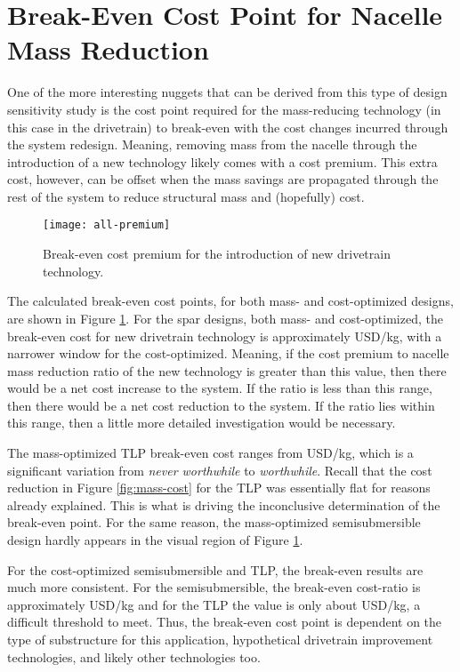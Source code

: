 \section{Break-Even Cost Point for Nacelle Mass Reduction}
One of the more interesting nuggets that can be derived from this type
of design sensitivity study is the cost point required for the
mass-reducing technology (in this case in the drivetrain) to break-even
with the cost changes incurred through the system redesign.  Meaning,
removing mass from the nacelle through the introduction of a new
technology likely comes with a cost premium.  This extra cost, however,
can be offset when the mass savings are propagated through the rest of
the system to reduce structural mass and (hopefully) cost.

\begin{figure}[htbp]
  \begin{center}
    \texttt{[image: all-premium]}
    \caption{Break-even cost premium for the introduction of new drivetrain
      technology.}
    \label{fig:premium}
  \end{center}
\end{figure}

The calculated break-even cost points, for both mass- and cost-optimized
designs, are shown in Figure \ref{fig:premium}.  For the spar designs,
both mass- and cost-optimized, the break-even cost for new drivetrain
technology is approximately \unit[700--1400]{USD/kg}, with a narrower
window for the cost-optimized.  Meaning, if the cost premium to nacelle
mass reduction ratio of the new technology is greater than this value,
then there would be a net cost increase to the system.  If the ratio is
less than this range, then there would be a net cost reduction to the
system.  If the ratio lies within this range, then a little more
detailed investigation would be necessary.

The mass-optimized TLP break-even cost ranges from
\unit[0--600]{USD/kg}, which is a significant variation from
\textit{never worthwhile} to \textit{worthwhile}.  Recall that the cost
reduction in Figure \ref{fig:mass-cost} for the TLP was essentially flat
for reasons already explained.  This is what is driving the inconclusive
determination of the break-even point.  For the same reason, the
mass-optimized semisubmersible design hardly appears in the visual
region of Figure \ref{fig:premium}.

For the cost-optimized semisubmersible and TLP, the break-even results
are much more consistent.  For the semisubmersible, the break-even
cost-ratio is approximately \unit[400--500]{USD/kg} and for the TLP the
value is only about \unit[100]{USD/kg}, a difficult threshold to meet.
Thus, the break-even cost point is dependent on the type of substructure
for this application, hypothetical drivetrain improvement technologies,
and likely other technologies too.
